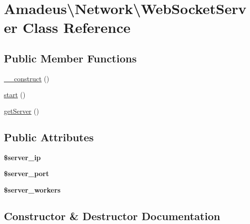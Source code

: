 \hypertarget{classAmadeus_1_1Network_1_1WebSocketServer}{}\section{Amadeus\textbackslash{}Network\textbackslash{}Web\+Socket\+Server Class Reference}
\label{classAmadeus_1_1Network_1_1WebSocketServer}
\subsection*{Public Member Functions}
\begin{DoxyCompactItemize}
\item 
\hyperlink{classAmadeus_1_1Network_1_1WebSocketServer_a67ad2ea602b707e6636fb3642de2997f}{\+\_\+\+\_\+construct} ()
\item 
\hyperlink{classAmadeus_1_1Network_1_1WebSocketServer_a1507e1b36260e440137cea054ee84d1d}{start} ()
\item 
\hyperlink{classAmadeus_1_1Network_1_1WebSocketServer_a90f0f757540b91a7cb860dd21cb1519a}{get\+Server} ()
\end{DoxyCompactItemize}
\subsection*{Public Attributes}
\begin{DoxyCompactItemize}
\item 
\mbox{\label{classAmadeus_1_1Network_1_1WebSocketServer_af9c804d1bcb5fdbe152c581c2dfe4ffd}} 
{\bfseries \$server\+\_\+ip}
\item 
\mbox{\label{classAmadeus_1_1Network_1_1WebSocketServer_ad3be5b67cc4c6b895a24eadf968fb50a}} 
{\bfseries \$server\+\_\+port}
\item 
\mbox{\label{classAmadeus_1_1Network_1_1WebSocketServer_a945b924703db1f2cb29b7819c31f1e6c}} 
{\bfseries \$server\+\_\+workers}
\end{DoxyCompactItemize}


\subsection{Constructor \& Destructor Documentation}
\mbox{\label{classAmadeus_1_1Network_1_1WebSocketServer_a67ad2ea602b707e6636fb3642de2997f}} 
